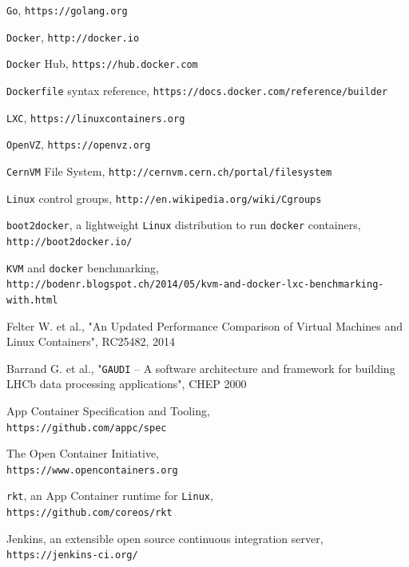 \documentclass[a4paper]{article}
\begin{document}
\begin{thebibliography}{9}

	 \texttt{Go},
		\verb'https://golang.org'

	 \texttt{Docker},
		\verb'http://docker.io'

	 \texttt{Docker} Hub,
		\verb'https://hub.docker.com'

	 \texttt{Dockerfile} syntax reference,
		\verb'https://docs.docker.com/reference/builder'

	 \texttt{LXC},
		\verb'https://linuxcontainers.org'

	 \texttt{OpenVZ},
		\verb'https://openvz.org'

	 \texttt{CernVM} File System,
		\verb'http://cernvm.cern.ch/portal/filesystem'

	 \texttt{Linux} control groups,
		\verb'http://en.wikipedia.org/wiki/Cgroups'

	 \texttt{boot2docker}, a lightweight \texttt{Linux}
		distribution to run \texttt{docker} containers,
		\verb'http://boot2docker.io/'

	 \texttt{KVM} and \texttt{docker} benchmarking,\\
		\verb'http://bodenr.blogspot.ch/2014/05/kvm-and-docker-lxc-benchmarking-with.html'

	 Felter W. et al., "An Updated Performance Comparison of Virtual Machines
		and Linux Containers", RC25482, 2014

	 Barrand G. et al., "\texttt{GAUDI} -- A software architecture and
		framework for building LHCb data processing applications",
		CHEP 2000

	 App Container Specification and Tooling,\\
		\verb'https://github.com/appc/spec'

	 The Open Container Initiative,\\
		\verb'https://www.opencontainers.org'

	 \texttt{rkt}, an App Container runtime for
		\texttt{Linux},\\
		\verb'https://github.com/coreos/rkt'

	 Jenkins, an extensible open source continuous
		integration server,
		\verb'https://jenkins-ci.org/'


\end{thebibliography}
\end{document}
